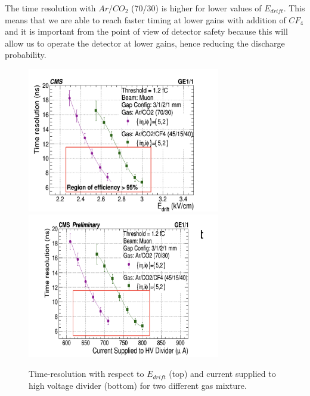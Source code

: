 The time resolution with $Ar/CO_2$ (70/30) is higher for lower values of $E_{drift}$.
This means that we are able to reach faster timing at lower gains with addition of $CF_4$ and it is important from the point of view of detector safety because this will allow us to operate the detector at lower gains, hence reducing the discharge probability.

\begin{figure}[!htbp]
\centering
\includegraphics[width=0.75\textwidth]{figures/GEM/TimeResolution_Edrift.jpeg}\\
\includegraphics[width=0.75\textwidth]{figures/GEM/TimeResolution_Current.jpeg}\\
\caption{Time-resolution with respect to $E_{drift}$ (top) and current supplied to high voltage divider (bottom) for two different gas mixture.}
\label{TimeResolution}
\end{figure}
